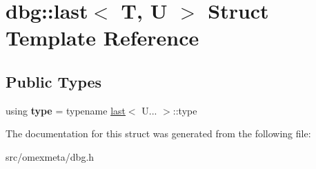 \hypertarget{structdbg_1_1last}{}\section{dbg\+:\+:last$<$ T, U $>$ Struct Template Reference}
\label{structdbg_1_1last}
\subsection*{Public Types}
\begin{DoxyCompactItemize}
\item 
\mbox{\label{structdbg_1_1last_aac2d6dd66fecfc0f3f37ecb4a02b0779}} 
using {\bfseries type} = typename \hyperlink{structdbg_1_1last}{last}$<$ U... $>$\+::type
\end{DoxyCompactItemize}


The documentation for this struct was generated from the following file\+:\begin{DoxyCompactItemize}
\item 
src/omexmeta/dbg.\+h\end{DoxyCompactItemize}
